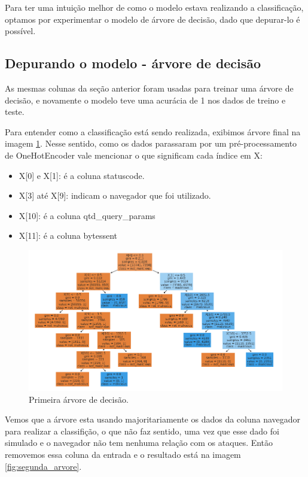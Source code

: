 Para ter uma intuição melhor de como o modelo estava realizando a classificação, optamos por experimentar 
o modelo de árvore de decisão, dado que depurar-lo é possível.

\subsection{Depurando o modelo - árvore de decisão}

As mesmas colunas da seção anterior foram usadas para treinar uma árvore de decisão, e novamente
o modelo teve uma acurácia de 1 nos dados de treino e teste. 

Para entender como a classificação está sendo realizada, exibimos árvore final na imagem \ref{fig:primeira_arvore}. Nesse sentido, 
como os dados parassaram por um pré-processamento de OneHotEncoder vale mencionar o que significam cada índice em X:

\begin{itemize}
    \item X[0] e X[1]: é a coluna statuscode.
    \item X[3] até X[9]: indicam o navegador que foi utilizado.
    \item X[10]: é a coluna qtd\_query\_params
    \item X[11]: é a coluna bytessent
\end{itemize}

\begin{figure}
    \centering
    \includegraphics[width=.9\textwidth]{figuras/primeira-arvore.png}
    \caption{Primeira árvore de decisão. \label{fig:primeira_arvore}}    
\end{figure}

Vemos que a árvore esta usando majoritariamente os dados da coluna navegador 
para realizar a classifição, o que não faz sentido, uma vez que esse dado foi simulado e o 
navegador não tem nenhuma relação com os ataques. Então removemos essa coluna da entrada 
e o resultado está na imagem \ref{fig:segunda_arvore}.


